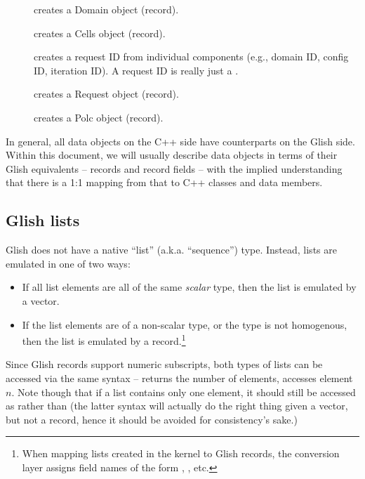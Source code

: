   \begin{description}
  
  \item[] creates a Domain object (record).

  \item[] creates a Cells object (record).

  \item[] creates a request ID from individual components
  (e.g., domain ID, config ID, iteration ID). A request ID is really just a
  .

  \item[] creates a Request object (record).
  
  \item[] creates a Polc object (record).
  
  \end{description}
  
  In general, all data objects on the C++ side have counterparts on the Glish
  side. Within this document, we will usually describe data objects in terms of
  their Glish equivalents -- records and record fields -- with the implied
  understanding that there is a 1:1 mapping from that to C++ classes and data
  members.

\subsection{Glish lists}

  Glish does not have a native ``list'' (a.k.a. ``sequence'') type.
  Instead, lists are emulated in one of two ways:

  \begin{itemize}

  \item If all list elements are all of the same {\em scalar} type,
  then the list is emulated by a vector.
  
  \item If the list elements are of a non-scalar type, or the type is not
  homogenous, then the list is emulated by a record.\footnote{When mapping lists created
  in the kernel to Glish records, the conversion layer assigns field names of
  the form , , etc.}
  \end{itemize}

  Since Glish records support numeric subscripts, both types of lists can be
  accessed via the same syntax --  returns the number of
  elements,  accesses element $n$. Note though that if a list
  contains only one element, it should still be accessed as  rather
  than  (the latter syntax will actually do the right thing given a
  vector, but not a record, hence it should be avoided for consistency's sake.)
  
